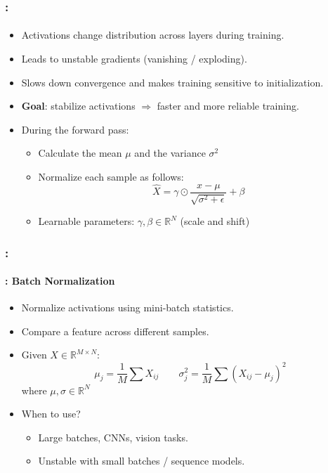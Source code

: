 \documentclass[xcolor=table]{beamer}
\begin{document}
\begin{frame}
	\frametitle{\insertshortsubtitle: \insertsection}
	\framesubtitle{\insertsubsection}
	
	\begin{itemize}
		\item Activations change distribution across layers during training.
		\item Leads to unstable gradients (vanishing / exploding).
		\item Slows down convergence and makes training sensitive to initialization.
		\item \textbf{Goal}: stabilize activations $\Rightarrow$ faster and more reliable training.
		\item During the forward pass:
		\begin{itemize}
			\item Calculate the mean $\mu$ and the variance $\sigma^2$
			\item Normalize each sample as follows:
			\[\hat{X} = \gamma \odot \frac{x - \mu}{\sqrt{\sigma^2 + \epsilon}} + \beta\]
			
			\item Learnable parameters: $\gamma, \beta \in \mathbb{R}^N$ (scale and shift)
		\end{itemize}
	\end{itemize}
	
\end{frame}

\begin{frame}
	\frametitle{\insertshortsubtitle: \insertsection}
	\framesubtitle{\insertsubsection: Batch Normalization}
	
	\begin{itemize}
		\item Normalize activations using mini-batch statistics.
		\item Compare a feature across different samples.
		\item Given $X \in \mathbb{R}^{M\times N}$:
		\[ \mu_{j} = \frac{1}{M} \sum X_{ij} \quad\quad \sigma_j^2 = \frac{1}{M} \sum (X_{ij} - \mu_j)^2\] 
		where $\mu, \sigma \in \mathbb{R}^N$
		\item When to use?
		\begin{itemize}
			\item Large batches, CNNs, vision tasks.
			\item Unstable with small batches / sequence models.
		\end{itemize}
	\end{itemize}
	
\end{frame}
\end{document}
